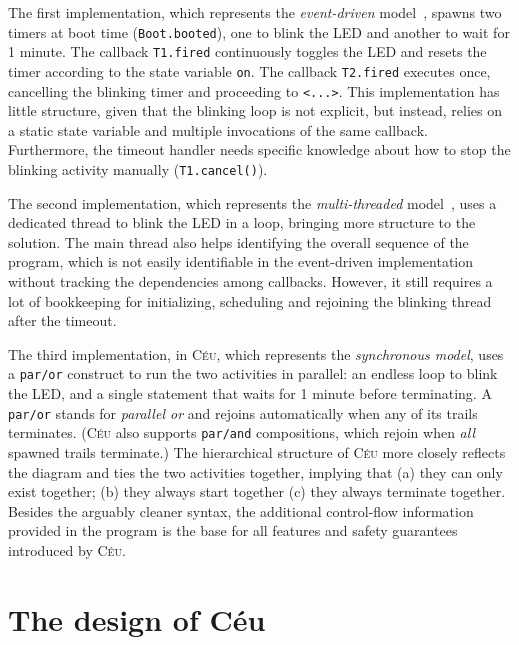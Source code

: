 \documentclass[10pt]{sensys-proc}
\newcommand{\CEU}{\textsc{C\'{e}u}\xspace}
\newcommand{\code}[1] {{\small{\texttt{#1}}}}
\begin{document}
The first implementation, which represents the \emph{event-driven} 
model~\cite{wsn.nesc,wsn.contiki}, spawns two timers at boot time 
(\code{Boot.booted}), one to blink the LED and another to wait for 1 minute.
The callback \code{T1.fired} continuously toggles the LED and resets the timer 
according to the state variable \code{on}.
The callback \code{T2.fired} executes once, cancelling the blinking timer and 
proceeding to \code{<...>}.
This implementation has little structure, given that the blinking loop is not 
explicit, but instead, relies on a static state variable and multiple 
invocations of the same callback.
Furthermore, the timeout handler needs specific knowledge about how to stop the 
blinking activity manually (\code{T1.cancel()}).

The second implementation, which represents the \emph{multi-threaded} 
model~\cite{wsn.protothreads,wsn.mantisos}, uses a dedicated thread to blink 
the LED in a loop, bringing more structure to the solution.
The main thread also helps identifying the overall sequence of the program, 
which is not easily identifiable in the event-driven implementation without 
tracking the dependencies among callbacks.
However, it still requires a lot of bookkeeping for initializing, scheduling 
and rejoining the blinking thread after the timeout.


The third implementation, in \CEU, which represents the \emph{synchronous 
model}, uses a \code{par/or} construct to run the two activities in parallel:
an endless loop to blink the LED, and a single statement that waits for 1 
minute before terminating.
A \code{par/or} stands for \emph{parallel or} and rejoins automatically when 
any of its trails terminates.
(\CEU also supports \code{par/and} compositions, which rejoin when \emph{all} 
spawned trails terminate.)
%
The hierarchical structure of \CEU more closely reflects the diagram and ties 
the two activities together, implying that
(a) they can only exist together;
(b) they always start together
(c) they always terminate together.
%
Besides the arguably cleaner syntax, the additional control-flow information 
provided in the program is the base for all features and safety guarantees 
introduced by \CEU.


\section{The design of C\'eu}
\label{sec.ceu}
\end{document}
